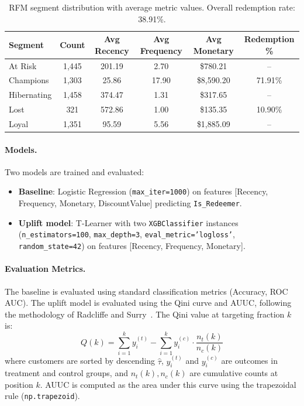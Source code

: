 \documentclass[11pt,a4paper,twoside]{article}
\begin{document}
\begin{table}[!htbp]
    \centering
    \scriptsize
    \setlength{\tabcolsep}{4pt}
    \renewcommand{\arraystretch}{1.15}
    \begin{tabularx}{\linewidth}{p{2.2cm} c c c c c}
    \toprule
    \textbf{Segment} & \textbf{Count} & \textbf{Avg Recency} & \textbf{Avg Frequency} & \textbf{Avg Monetary} & \textbf{Redemption \%} \\
    \midrule
    At Risk & 1,445 & 201.19 & 2.70 & \$780.21 & -- \\
    Champions & 1,303 & 25.86 & 17.90 & \$8,590.20 & 71.91\% \\
    Hibernating & 1,458 & 374.47 & 1.31 & \$317.65 & -- \\
    Lost & 321 & 572.86 & 1.00 & \$135.35 & 10.90\% \\
    Loyal & 1,351 & 95.59 & 5.56 & \$1,885.09 & -- \\
    \bottomrule
    \end{tabularx}
    \caption{RFM segment distribution with average metric values. Overall redemption rate: 38.91\%.}
    \label{tab:rfm_segments}
\end{table}

\paragraph{Models.}
Two models are trained and evaluated:
\begin{itemize}
    \item \textbf{Baseline}: Logistic Regression (\texttt{max\_iter=1000}) on features [Recency, Frequency, Monetary, DiscountValue] predicting \texttt{Is\_Redeemer}.
    \item \textbf{Uplift model}: T-Learner with two \texttt{XGBClassifier} instances (\texttt{n\_estimators=100}, \texttt{max\_depth=3}, \texttt{eval\_metric='logloss'}, \texttt{random\_state=42}) on features [Recency, Frequency, Monetary].
\end{itemize}

\paragraph{Evaluation Metrics.}
The baseline is evaluated using standard classification metrics (Accuracy, ROC AUC). The uplift model is evaluated using the Qini curve and AUUC, following the methodology of Radcliffe and Surry~\cite{radcliffe2011}. The Qini value at targeting fraction $k$ is:
\begin{equation}
Q(k) = \sum_{i=1}^{k} y_i^{(t)} - \sum_{i=1}^{k} y_i^{(c)} \cdot \frac{n_t(k)}{n_c(k)}
\label{eq:qini}
\end{equation}
where customers are sorted by descending $\hat{\tau}$, $y_i^{(t)}$ and $y_i^{(c)}$ are outcomes in treatment and control groups, and $n_t(k), n_c(k)$ are cumulative counts at position $k$. AUUC is computed as the area under this curve using the trapezoidal rule (\texttt{np.trapezoid}).
\end{document}
